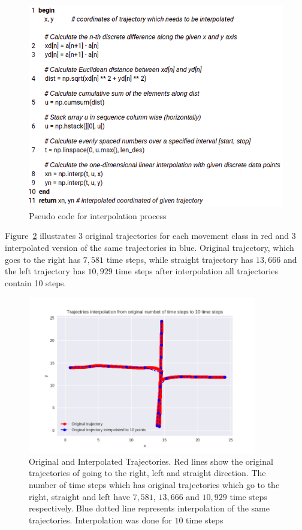 \begin{figure}[H]
	\centering  	
	\includegraphics[width=13cm]{img/interpolation.jpg}
	\caption{Pseudo code for interpolation process}
	\label{fig:pseudoInter}    
\end{figure}

Figure~\ref{fig:InterExam} illustrates $3$ original trajectories for each movement class in red and $3$ interpolated version of the same trajectories in blue. Original trajectory, which goes to the right has $7,581$ time steps, while straight trajectory has $13,666$ and the left trajectory has $10,929$ time steps after interpolation all trajectories contain 10 steps.

\begin{figure}[H]
	\centering  	
	\includegraphics[width=10cm]{img/trajInnter.png}
	\caption{Original and Interpolated Trajectories. Red lines show the original trajectories of going to the right, left and straight direction. The number of time steps which has original trajectories which go to the right, straight and left have $7,581$, $13,666$ and $10,929$ time steps respectively. Blue dotted line represents interpolation of the same trajectories. Interpolation was done for $10$ time steps}
	\label{fig:InterExam}    
\end{figure}

